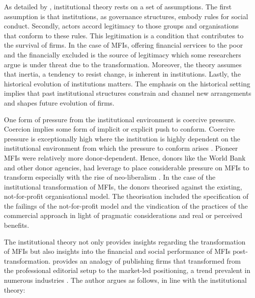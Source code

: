 \documentclass[a4paper,nobind]{templates/ociamthesis}
\begin{document}
As detailed by \textcite{ritzer2004encyclopedia}, institutional theory rests on a set of assumptions. The first assumption is that institutions, as governance structures, embody rules for social conduct. Secondly, actors accord legitimacy to those groups and organisations that conform to these rules. This legitimation is a condition that contributes to the survival of firms. In the case of MFIs, offering financial services to the poor and the financially excluded is the source of legitimacy which some researchers argue is under threat due to the transformation. Moreover, the theory assumes that inertia, a tendency to resist change, is inherent in institutions. Lastly, the historical evolution of institutions matters. The emphasis on the historical setting implies that past institutional structures constrain and channel new arrangements and shapes future evolution of firms.

One form of pressure from the institutional environment is coercive pressure. Coercion implies some form of implicit or explicit push to conform. Coercive pressure is exceptionally high where the institution is highly dependent on the institutional environment from which the pressure to conform arises \autocite{meyer1977institutionalized}. Pioneer MFIs were relatively more donor-dependent. Hence, donors like the World Bank and other donor agencies, had leverage to place considerable pressure on MFIs to transform especially with the rise of neo-liberalism \autocite{ostry2016neoliberalism}. In the case of the institutional transformation of MFIs, the donors theorised against the existing, not-for-profit organisational model. The theorisation included the specification of the failings of the not-for-profit model and the vindication of the practices of the commercial approach in light of pragmatic considerations \autocite{tina2002institutional} and real or perceived benefits.

The institutional theory not only provides insights regarding the transformation of MFIs but also insights into the financial and social performance of MFIs post-transformation. \textcite{thornton2002rise} provides an analogy of publishing firms that transformed from the professional editorial setup to the market-led positioning, a trend prevalent in numerous industries \autocite{thornton2015institutional}. The author argues as follows, in line with the institutional theory:
\end{document}
